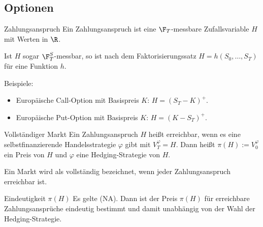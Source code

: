 \subsection{Optionen}

\begin{karte}{Zahlungsanspruch}
Ein Zahlungsanspruch ist eine \(\F_T\)-messbare Zufallsvariable \(H\) mit Werten in \(\R\).

Ist \(H\) sogar \(\F_T^S\)-messbar, so ist nach dem Faktorisierungssatz \(H = h(S_0, \ldots, S_T)\) 
für eine Funktion \(h\).

Beispiele: 
\begin{itemize}
    \item Europäische Call-Option mit Basispreis \(K\): \(H = (S_T - K)^+\).
    \item Europäische Put-Option mit Basispreis \(K\): \(H = (K - S_T)^+\).
\end{itemize}
\end{karte}

\begin{karte}{Vollständiger Markt}
Ein Zahlungsanspruch \(H\) heißt erreichbar, wenn es eine selbstfinanzierende Handelsstrategie \(\varphi\) 
gibt mit \(V_T^\varphi = H\). Dann heißt \(\pi(H) := V_0^\varphi\) ein Preis von \(H\) und \(\varphi\) eine 
Hedging-Strategie von \(H\).

Ein Markt wird als vollständig bezeichnet, wenn jeder Zahlungsanspruch erreichbar ist.
\end{karte}

\begin{karte}{Eindeutigkeit \(\pi(H)\)}
Es gelte (NA). Dann ist der Preis \(\pi(H)\) für erreichbare Zahlungsansprüche eindeutig bestimmt und damit 
unabhängig von der Wahl der Hedging-Strategie.
\end{karte}